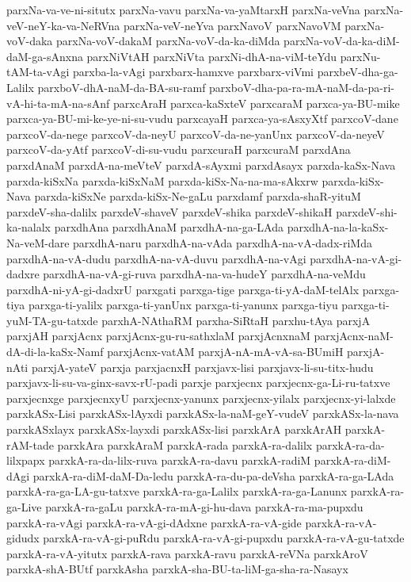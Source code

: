{parxNa-va-ve-ni-situtx
parxNa-vavu
parxNa-va-yaMtarxH
parxNa-veVna
parxNa-veV-neY-ka-va-NeRVna
parxNa-veV-neYva
parxNavoV
parxNavoVM
parxNa-voV-daka
parxNa-voV-dakaM
parxNa-voV-da-ka-diMda
parxNa-voV-da-ka-diM-daM-ga-sAnxna
parxNiVtAH
parxNiVta
parxNi-dhA-na-viM-teYdu
parxNu-tAM-ta-vAgi
parxba-la-vAgi
parxbarx-hamxve
parxbarx-viVmi
parxbeV-dha-ga-Lalilx
parxboV-dhA-naM-da-BA-su-ramf
parxboV-dha-pa-ra-mA-naM-da-pa-ri-vA-hi-ta-mA-na-sAnf
parxcAraH
parxca-kaSxteV
parxcaraM
parxca-ya-BU-mike
parxca-ya-BU-mi-ke-ye-ni-su-vudu
parxcayaH
parxca-ya-sAsxyXtf
parxcoV-dane
parxcoV-da-nege
parxcoV-da-neyU
parxcoV-da-ne-yanUnx
parxcoV-da-neyeV
parxcoV-da-yAtf
parxcoV-di-su-vudu
parxcuraH
parxcuraM
parxdAna
parxdAnaM
parxdA-na-meVteV
parxdA-sAyxmi
parxdAsayx
parxda-kaSx-Nava
parxda-kiSxNa
parxda-kiSxNaM
parxda-kiSx-Na-na-ma-sAkxrw
parxda-kiSx-Nava
parxda-kiSxNe
parxda-kiSx-Ne-gaLu
parxdamf
parxda-shaR-yituM
parxdeV-sha-dalilx
parxdeV-shaveV
parxdeV-shika
parxdeV-shikaH
parxdeV-shi-ka-nalalx
parxdhAna
parxdhAnaM
parxdhA-na-ga-LAda
parxdhA-na-la-kaSx-Na-veM-dare
parxdhA-naru
parxdhA-na-vAda
parxdhA-na-vA-dadx-riMda
parxdhA-na-vA-dudu
parxdhA-na-vA-duvu
parxdhA-na-vAgi
parxdhA-na-vA-gi-dadxre
parxdhA-na-vA-gi-ruva
parxdhA-na-va-hudeY
parxdhA-na-veMdu
parxdhA-ni-yA-gi-dadxrU
parxgati
parxga-tige
parxga-ti-yA-daM-telAlx
parxga-tiya
parxga-ti-yalilx
parxga-ti-yanUnx
parxga-ti-yanunx
parxga-tiyu
parxga-ti-yuM-TA-gu-tatxde
parxhA-NAthaRM
parxha-SiRtaH
parxhu-tAya
parxjA
parxjAH
parxjAcnx
parxjAcnx-gu-ru-sathxlaM
parxjAcnxnaM
parxjAcnx-naM-dA-di-la-kaSx-Namf
parxjAcnx-vatAM
parxjA-nA-mA-vA-sa-BUmiH
parxjA-nAti
parxjA-yateV
parxja
parxjacnxH
parxjavx-lisi
parxjavx-li-su-titx-hudu
parxjavx-li-su-va-ginx-savx-rU-padi
parxje
parxjecnx
parxjecnx-ga-Li-ru-tatxve
parxjecnxge
parxjecnxyU
parxjecnx-yanunx
parxjecnx-yilalx
parxjecnx-yi-lalxde
parxkASx-Lisi
parxkASx-lAyxdi
parxkASx-la-naM-geY-vudeV
parxkASx-la-nava
parxkASxlayx
parxkASx-layxdi
parxkASx-lisi
parxkArA
parxkArAH
parxkA-rAM-tade
parxkAra
parxkAraM
parxkA-rada
parxkA-ra-dalilx
parxkA-ra-da-lilxpapx
parxkA-ra-da-lilx-ruva
parxkA-ra-davu
parxkA-radiM
parxkA-ra-diM-dAgi
parxkA-ra-diM-daM-Da-ledu
parxkA-ra-du-pa-deVsha
parxkA-ra-ga-LAda
parxkA-ra-ga-LA-gu-tatxve
parxkA-ra-ga-Lalilx
parxkA-ra-ga-Lanunx
parxkA-ra-ga-Live
parxkA-ra-gaLu
parxkA-ra-mA-gi-hu-dava
parxkA-ra-ma-pupxdu
parxkA-ra-vAgi
parxkA-ra-vA-gi-dAdxne
parxkA-ra-vA-gide
parxkA-ra-vA-gidudx
parxkA-ra-vA-gi-puRdu
parxkA-ra-vA-gi-pupxdu
parxkA-ra-vA-gu-tatxde
parxkA-ra-vA-yitutx
parxkA-rava
parxkA-ravu
parxkA-reVNa
parxkAroV
parxkA-shA-BUtf
parxkAsha
parxkA-sha-BU-ta-liM-ga-sha-ra-Nasayx
}
